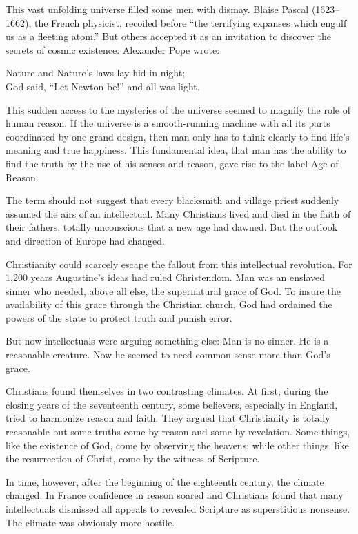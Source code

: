 This vast unfolding universe filled some men with dismay. Blaise Pascal (1623–1662), the French
physicist, recoiled before “the terrifying expanses which engulf us as a fleeting atom.” But others
accepted it as an invitation to discover the secrets of cosmic existence. Alexander Pope wrote:

\begin{poem}
Nature and Nature’s laws lay hid in night;\\
God said, “Let Newton be!” and all was light.
\end{poem}

This sudden access to the mysteries of the universe seemed to magnify the role of human reason. If
the universe is a smooth-running machine with all its parts coordinated by one grand design, then
man only has to think clearly to find life’s meaning and true happiness. This fundamental idea, that
man has the ability to find the truth by the use of his senses and reason, gave rise to the label
Age of Reason.

The term should not suggest that every blacksmith and village priest suddenly assumed the airs of an
intellectual. Many Christians lived and died in the faith of their fathers, totally unconscious that
a new age had dawned. But the outlook and direction of Europe had changed.

Christianity could scarcely escape the fallout from this intellectual revolution. For 1,200 years
Augustine’s ideas had ruled Christendom. Man was an enslaved sinner who needed, above all else, the
supernatural grace of God. To insure the availability of this grace through the Christian church,
God had ordained the powers of the state to protect truth and punish error.

But now intellectuals were arguing something else: Man is no sinner. He is a reasonable creature.
Now he seemed to need common sense more than God’s grace.

Christians found themselves in two contrasting climates. At first, during the closing years of the
seventeenth century, some believers, especially in England, tried to harmonize reason and faith.
They argued that Christianity is totally reasonable but some truths come by reason and some by
revelation. Some things, like the existence of God, come by observing the heavens; while other
things, like the resurrection of Christ, come by the witness of Scripture.

In time, however, after the beginning of the eighteenth century, the climate changed. In France
confidence in reason soared and Christians found that many intellectuals dismissed all appeals to
revealed Scripture as superstitious nonsense. The climate was obviously more hostile.

